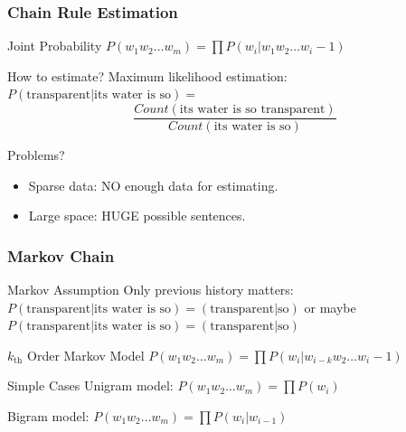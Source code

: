 \documentclass{beamer}
\begin{document}


\begin{frame}\frametitle{Chain Rule Estimation}

\begin{block}{Joint Probability}
  \quad $P(w_1w_2\ldots w_m) = \prod P(w_i|w_1w_2\ldots w_i-1)$
\end{block}

\begin{block}{How to estimate?}
Maximum likelihood estimation: \\
 \quad  $P(\text{transparent}|\text{its water is so}) = $\\ 
$$\frac{Count(\text{its water is so transparent})}{Count(\text{its water is so})}$$
\end{block}

\begin{block}{Problems?}
\begin{itemize}
\item Sparse data: NO enough data for estimating.
\item Large space: HUGE possible sentences.
\end{itemize}
\end{block}

\end{frame}


\begin{frame}\frametitle{Markov Chain}

\begin{block}{Markov Assumption}
  Only previous history matters: \\
 \quad  $P(\text{transparent}|\text{its water is so}) =
 (\text{transparent}|\text{so})$  or maybe \\
 \quad  $P(\text{transparent}|\text{its water is so}) = 
 (\text{transparent}|\text{so})$  
\end{block}

\begin{block}{$k_{\text{th}}$ Order Markov Model}
 \quad $P(w_1w_2\ldots w_m) = \prod P(w_i|w_{i-k}w_2\ldots w_i-1)$
\end{block}

\begin{block}{Simple Cases}
Unigram model:
 \quad $P(w_1w_2\ldots w_m) = \prod P(w_i)$

Bigram model:
 \quad $P(w_1w_2\ldots w_m) = \prod P(w_i|w_{i-1})$
\end{block}

\end{frame}
\end{document}
